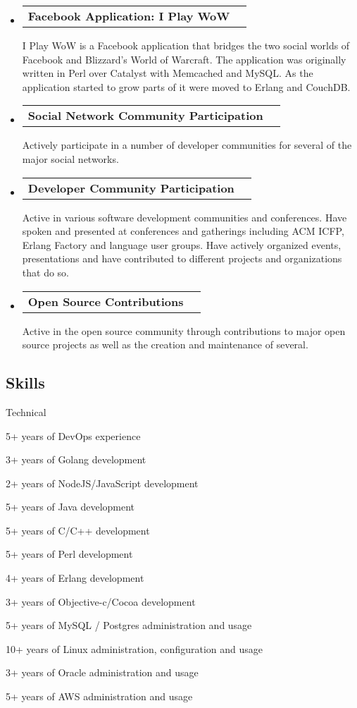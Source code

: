 \documentclass[10pt,letterpaper]{article}
\makeatletter
\newenvironment{indentsection}[1]%
{\begin{list}{}%
  {\setlength{\leftmargin}{#1}}%
  \item[]%
}
{\end{list}}
\newcommand{\headerrow}[2]
{\begin{tabular*}{\linewidth}{l@{\extracolsep{\fill}}r}
  #1 &
  #2 \\
\end{tabular*}}
\makeatother
\begin{document}
\begin{itemize}
  \parskip=0.1em

  \item
  \headerrow
    {\textbf{Facebook Application: I Play WoW}}
    {\textbf{}}
    I Play WoW is a Facebook application that bridges the two social worlds of Facebook and Blizzard's World of Warcraft. The application was originally written in Perl over Catalyst with Memcached and MySQL. As the application started to grow parts of it were moved to Erlang and CouchDB.
  \item
  \headerrow
    {\textbf{Social Network Community Participation}}
    {\textbf{}}
    Actively participate in a number of developer communities for several of the major social networks.
  \item
  \headerrow
    {\textbf{Developer Community Participation}}
    {\textbf{}}
    Active in various software development communities and conferences. Have spoken and presented at conferences and gatherings including ACM ICFP, Erlang Factory and language user groups. Have actively organized events, presentations and have contributed to different projects and organizations that do so.
  \item
  \headerrow
    {\textbf{Open Source Contributions}}
    {\textbf{}}
    Active in the open source community through contributions to major open source projects as well as the creation and maintenance of several.
\end{itemize}

\vspace{-0.4em}
\subsection*{Skills}

\begin{indentsection}{\parindent}
Technical
\begin{itemize*}
        \item 5+ years of DevOps experience
        \item 3+ years of Golang development
        \item 2+ years of NodeJS/JavaScript development
        \item 5+ years of Java development
        \item 5+ years of C/C++ development
        \item 5+ years of Perl development
        \item 4+ years of Erlang development
        \item 3+ years of Objective-c/Cocoa development
        \item 5+ years of MySQL / Postgres administration and usage
        \item 10+ years of Linux administration, configuration and usage
        \item 3+ years of Oracle administration and usage
        \item 5+ years of AWS administration and usage
\end{itemize*}

\end{indentsection}
\end{document}
